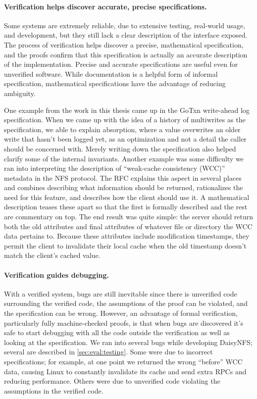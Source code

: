 \paragraph{Verification helps discover accurate, precise specifications.} Some
systems are extremely reliable, due to extensive testing, real-world usage, and
development, but they still lack a clear description of the interface exposed.
The process of verification helps discover a precise, mathematical
specification, and the proofs confirm that this specification is actually an
accurate description of the implementation. Precise and accurate specifications
are useful even for unverified software. While documentation is a helpful form
of informal specification, mathematical specifications have the advantage of
reducing ambiguity.

One example from the work in this thesis came up in the GoTxn write-ahead log
specification. When we came up with the idea of a history of multiwrites as the
specification, we able to explain absorption, where a value overwrites an older
write that hasn't been logged yet, as an optimization and not a detail the
caller should be concerned with. Merely writing down the specification also
helped clarify some of the internal invariants. Another example was some
difficulty we ran into interpreting the description of ``weak-cache consistency
(WCC)'' metadata in the NFS protocol. The RFC explains this aspect in several
places and combines describing what information should be returned, rationalizes
the need for this feature, and describes how the client should use it. A
mathematical description teases these apart so that the first is formally
described and the rest are commentary on top. The end result was quite simple:
the server should return both the old attributes and final attributes of
whatever file or directory the WCC data pertains to. Because these attributes
include modification timestamps, they permit the client to invalidate their
local cache when the old timestamp doesn't match the client's cached value.

\paragraph{Verification guides debugging.} With a verified system, bugs are
still inevitable since there is unverified code surrounding the verified code,
the assumptions of the proof can be violated, and the specification can be
wrong. However, an advantage of formal verification, particularly fully
machine-checked proofs, is that when bugs are discovered it's safe to start
debugging with all the code outside the verification as well as looking at the
specification. We ran into several bugs while developing DaisyNFS; several are
described in \cref{sec:eval:testing}. Some were due
to incorrect specifications; for example, at one point we returned the wrong
``before'' WCC data, causing Linux to constantly invalidate its cache and send
extra RPCs and reducing performance. Others were due to unverified code
violating the assumptions in the verified code.

